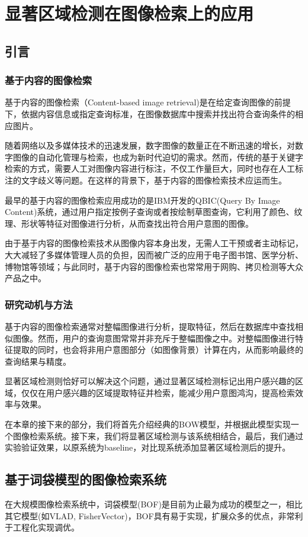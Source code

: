 \chapter{显著区域检测在图像检索上的应用}

\section{引言}
\subsection{基于内容的图像检索}
基于内容的图像检索（Content-based image retrieval)是在给定查询图像的前提下，依据内容信息或指定查询标准，在图像数据库中搜索并找出符合查询条件的相应图片\cite{cyy2007img}。

随着网络以及多媒体技术的迅速发展，数字图像的数量正在不断迅速的增长，对数字图像的自动化管理与检索，也成为新时代迫切的需求。然而，传统的基于关键字检索的方式，需要人工对图像内容进行标注，不仅工作量巨大，同时也存在人工标注的文字歧义等问题。在这样的背景下，基于内容的图像检索技术应运而生。

最早的基于内容的图像检索应用成功的是IBM开发的QBIC\cite{qbic}(Query By Image Content)系统，通过用户指定按例子查询或者按绘制草图查询，它利用了颜色、纹理、形状等特征对图像进行分析，从而查找出符合用户意图的图像。

由于基于内容的图像检索技术从图像内容本身出发，无需人工干预或者主动标记，大大减轻了多媒体管理人员的负担，因而被广泛的应用于电子图书馆、医学分析、博物馆等领域；与此同时，基于内容的图像检索也常常用于网购、拷贝检测等大众产品之中。

\subsection{研究动机与方法}
基于内容的图像检索通常对整幅图像进行分析，提取特征，然后在数据库中查找相似图像。然而，用户的查询意图常常并非充斥于整幅图像之中。对整幅图像进行特征提取的同时，也会将非用户意图部分（如图像背景）计算在内，从而影响最终的查询结果与精度。

显著区域检测则恰好可以解决这个问题，通过显著区域检测标记出用户感兴趣的区域，仅仅在用户感兴趣的区域提取特征并检索，能减少用户意图鸿沟，提高检索效率与效果。

在本章的接下来的部分，我们将首先介绍经典的BOW模型，并根据此模型实现一个图像检索系统。接下来，我们将显著区域检测与该系统相结合，最后，我们通过实验验证效果，以原系统为baseline，对比现系统添加显著区域检测后的提升。

\section{基于词袋模型的图像检索系统}
在大规模图像检索系统中，词袋模型(BOF)是目前为止最为成功的模型之一\cite{arandjelovic2012three}，相比其它模型(如VLAD\cite{arandjelovic2013all}, FisherVector\cite{perronnin2010large})，BOF具有易于实现，扩展众多的优点，非常利于工程化实现调优。

